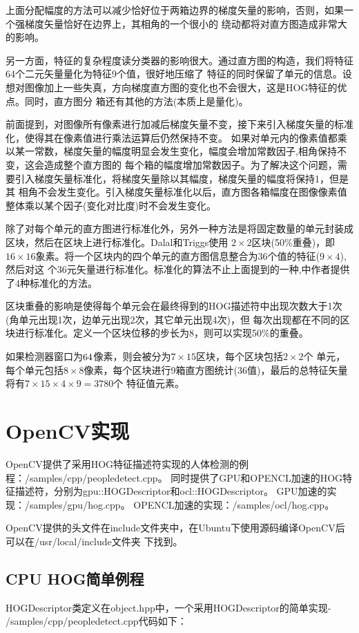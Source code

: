 \documentclass[10pt,technote,onecolumn,twoside]{IEEEtran}
\begin{document}
上面分配幅度的方法可以减少恰好位于两箱边界的梯度矢量的影响，否则，如果一个强梯度矢量恰好在边界上，其相角的一个很小的
绕动都将对直方图造成非常大的影响。

另一方面，特征的复杂程度读分类器的影响很大。通过直方图的构造，我们将特征{64个二元矢量}量化为特征{9个值}，很好地压缩了
特征的同时保留了单元的信息。设想对图像加上一些失真，方向梯度直方图的变化也不会很大，这是HOG特征的优点。同时，直方图分
箱还有其他的方法(本质上是量化)。

前面提到，对图像所有像素进行加减后梯度矢量不变，接下来引入梯度矢量的标准化，使得其在像素值进行乘法运算后仍然保持不变。
如果对单元内的像素值都乘以某一常数，梯度矢量的幅度明显会发生变化，幅度会增加常数因子,相角保持不变，这会造成整个直方图的
每个箱的幅度增加常数因子。为了解决这个问题，需要引入梯度矢量标准化，将梯度矢量除以其幅度，梯度矢量的幅度将保持1，但是其
相角不会发生变化。引入梯度矢量标准化以后，直方图各箱幅度在图像像素值整体乘以某个因子(变化对比度)时不会发生变化。

除了对每个单元的直方图进行标准化外，另外一种方法是将固定数量的单元封装成区块，然后在区块上进行标准化。Dalal和Triggs使用
$2\times2$区块(50\%重叠)，即$16\times16$象素。将一个区块内的四个单元的直方图信息整合为36个值的特征($9\times4$),然后对这
个36元矢量进行标准化。标准化的算法不止上面提到的一种,\cite{bib1}中作者提供了4种标准化的方法。

区块重叠的影响是使得每个单元会在最终得到的HOG描述符中出现次数大于1次(角单元出现1次，边单元出现2次，其它单元出现4次)，但
每次出现都在不同的区块进行标准化。定义一个区块位移的步长为8，则可以实现50\%的重叠。

如果检测器窗口为$64\time128$像素，则会被分为$7\times15$区块，每个区块包括$2\times2$个
单元，每个单元包括$8\times8$像素，每个区块进行9箱直方图统计(36值)，最后的总特征矢量将有$7\times15\times4\times9=3780$个
特征值元素。



\section{OpenCV实现}
OpenCV提供了采用HOG特征描述符实现的人体检测的例程：\textsf{/samples/cpp/peopledetect.cpp}。
同时提供了GPU和OPENCL加速的HOG特征描述符，分别为\textsf{gpu::HOGDescriptor}和\textsf{ocl::HOGDescriptor}。
GPU加速的实现：\textsf{/samples/gpu/hog.cpp}。
OPENCL加速的实现：\textsf{/samples/ocl/hog.cpp}。

OpenCV提供的头文件在\textsf{include}文件夹中，在Ubuntu下使用源码编译OpenCV后可以在\textsf{/usr/local/include}文件夹
下找到。
\subsection{CPU HOG简单例程}
\textsf{HOGDescriptor}类定义在\textsf{object.hpp}中，一个采用\textsf{HOGDescriptor}的简单实现-
\textsf{/samples/cpp/peopledetect.cpp}代码如下：
\end{document}
